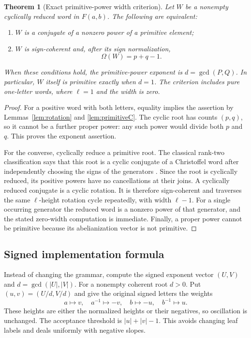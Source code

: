 \documentclass[11pt,letterpaper]{article}
\newtheorem{theorem}{Theorem}[section]
\theoremstyle{definition}
\begin{document}
\begin{theorem}[Exact primitive-power width criterion]
\label{thm:width}
Let $W$ be a nonempty cyclically reduced word in $F(a,b)$. The following are
equivalent:
\begin{enumerate}[label=(\roman*),nosep]
\item $W$ is a conjugate of a nonzero power of a primitive element;
\item $W$ is sign-coherent and, after its sign normalization,
\[
 \Omega(W)=p+q-1.
\]
\end{enumerate}
When these conditions hold, the primitive-power exponent is
$d=\gcd(P,Q)$. In particular, $W$ itself is primitive exactly when $d=1$.
The criterion includes pure one-letter words, where $\ell=1$ and the width
is zero.
\end{theorem}
\begin{proof}
For a positive word with both letters, equality implies the assertion by
Lemmas~\ref{lem:rotation} and \ref{lem:primitiveC}. The cyclic root has counts
$(p,q)$, so it cannot be a further proper power: any such power would divide
both $p$ and $q$. This proves the exponent assertion.

For the converse, cyclically reduce a primitive root. The classical
rank-two classification says that this root is a cyclic conjugate of a
Christoffel word after independently choosing the signs of the generators
\cite[Corollary~3.3]{KR}. Since the root is cyclically reduced, its positive
powers have no cancellations at their joins. A cyclically reduced conjugate
is a cyclic rotation. It is therefore sign-coherent and traverses the same
$\ell$-height rotation cycle repeatedly, with width $\ell-1$.
For a single occurring generator the reduced word is a nonzero power of that
generator, and the stated zero-width computation is immediate. Finally,
a proper power cannot be primitive because its abelianization vector is
not primitive.
\end{proof}

\subsection{Signed implementation formula}
Instead of changing the grammar, compute the signed exponent vector
$(U,V)$ and $d=\gcd(|U|,|V|)$. For a nonempty coherent root $d>0$. Put
$(u,v)=(U/d,V/d)$ and give the original signed letters the weights
\begin{equation}
 a\mapsto v,\quad a^{-1}\mapsto-v,\quad
 b\mapsto-u,\quad b^{-1}\mapsto u.
 \label{eq:signedweights}
\end{equation}
These heights are either the normalized heights or their negatives, so
oscillation is unchanged. The acceptance threshold is $|u|+|v|-1$.
This avoids changing leaf labels and deals uniformly with negative slopes.
\end{document}
